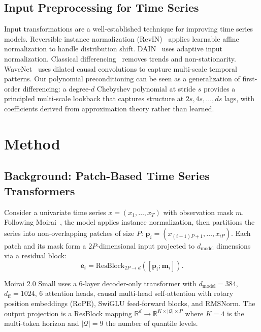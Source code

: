 \documentclass{article}
\begin{document}
\subsection{Input Preprocessing for Time Series}

Input transformations are a well-established technique for improving time series models. Reversible instance normalization (RevIN)~\citep{kim2022reversible} applies learnable affine normalization to handle distribution shift. DAIN~\citep{passalis2020deep} uses adaptive input normalization. Classical differencing~\citep{box1970time} removes trends and non-stationarity. WaveNet~\citep{oord2016wavenet} uses dilated causal convolutions to capture multi-scale temporal patterns. Our polynomial preconditioning can be seen as a generalization of first-order differencing: a degree-$d$ Chebyshev polynomial at stride $s$ provides a principled multi-scale lookback that captures structure at $2s, 4s, \ldots, ds$ lags, with coefficients derived from approximation theory rather than learned.

\section{Method}
\label{sec:method}

\subsection{Background: Patch-Based Time Series Transformers}

Consider a univariate time series $x = (x_1, \ldots, x_T)$ with observation mask $m$. Following Moirai~\citep{woo2024unified,liu2024moirai2}, the model applies instance normalization, then partitions the series into non-overlapping patches of size $P$: $\mathbf{p}_i = (x_{(i-1)P+1}, \ldots, x_{iP})$. Each patch and its mask form a $2P$-dimensional input projected to $d_{\text{model}}$ dimensions via a residual block:
\begin{equation}
\mathbf{e}_i = \text{ResBlock}_{2P \to d}([\mathbf{p}_i; \mathbf{m}_i]).
\end{equation}

Moirai 2.0 Small uses a 6-layer decoder-only transformer with $d_{\mathrm{model}} = 384$, $d_{\mathrm{ff}} = 1024$, 6 attention heads, causal multi-head self-attention with rotary position embeddings (RoPE), SwiGLU feed-forward blocks, and RMSNorm. The output projection is a ResBlock mapping $\mathbb{R}^d \to \mathbb{R}^{K \times |\mathcal{Q}| \times P}$ where $K{=}4$ is the multi-token horizon and $|\mathcal{Q}|{=}9$ the number of quantile levels.
\end{document}
